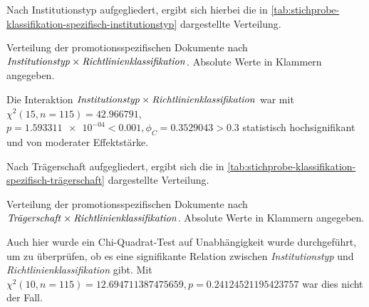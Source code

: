 Nach Institutionstyp aufgegliedert, ergibt sich hierbei die in \cref{tab:stichprobe-klassifikation-spezifisch-institutionstyp} dargestellte Verteilung.
\begin{table}[!htbp]
	\caption{Verteilung der promotionsspezifischen Dokumente nach $\text{\textit{Institutionstyp}}\times\text{\textit{Richtlinienklassifikation}}$.
    Absolute Werte in Klammern angegeben.}
    
	\label{tab:stichprobe-klassifikation-spezifisch-institutionstyp}
\end{table}
Die Interaktion $\text{\textit{Institutionstyp}}\times\text{\textit{Richtlinienklassifikation}}$ war mit $\chi^2 (\num{15}, n=\num{115}) = \num[round-mode=places,round-precision=2]{42,966791}$, $p = \num[round-mode=places,round-precision=2]{1,593311e-04}<\num{0.001}, \phi_C=\num[round-mode=places,round-precision=2]{0.3529043}>\num{0.3}$ statistisch hochsignifikant und von moderater Effektstärke.

Nach Trägerschaft aufgegliedert, ergibt sich die in \cref{tab:stichprobe-klassifikation-spezifisch-trägerschaft} dargestellte Verteilung.
\begin{table}[!htbp]
	\caption{Verteilung der promotionsspezifischen Dokumente nach $\text{\textit{Trägerschaft}}\times\text{\textit{Richtlinienklassifikation}}$.
    Absolute Werte in Klammern angegeben.}
    
	\label{tab:stichprobe-klassifikation-spezifisch-trägerschaft}
\end{table}
Auch hier wurde ein Chi-Quadrat-Test auf Unabhängigkeit wurde durchgeführt, um zu überprüfen, ob es eine signifikante Relation zwischen \textit{Institutionstyp} und \textit{Richtlinienklassifikation} gibt.
Mit $\chi^2 (\num{10}, n=\num{115}) = \num[round-mode=places,round-precision=2]{12,694711387475659}, p = \num[round-mode=places,round-precision=2]{0,24124521195423757}$ war dies nicht der Fall.

